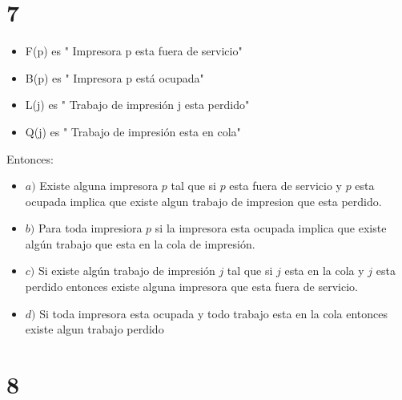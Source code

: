 \documentclass[12pt, fleqn]{article}                            %
\theoremstyle{break}                                            %
\begin{document}
\clearpage
\section{7}

    \begin{itemize}
        \item F(p) es " Impresora p esta fuera de servicio"
        \item B(p) es " Impresora p está ocupada"
        \item L(j) es " Trabajo de impresión j esta perdido"
        \item Q(j) es " Trabajo de impresión esta en cola"
    \end{itemize}

    Entonces:
    \begin{itemize}
        
        \item $a)$
            Existe alguna impresora $p$ tal que si $p$ esta fuera de servicio
            y $p$ esta ocupada implica que existe algun trabajo de impresion
            que esta perdido.

        \item $b)$
            Para toda impresiora $p$ si la impresora esta ocupada implica
            que existe algún trabajo que esta en la cola de impresión.

        \item $c)$
            Si existe algún trabajo de impresión $j$ tal que si $j$ esta
            en la cola y $j$ esta perdido entonces existe alguna impresora
            que esta fuera de servicio.

        \item $d)$
            Si toda impresora esta ocupada y todo trabajo esta en la cola
            entonces existe algun trabajo perdido

    \end{itemize}




\clearpage
\section{8}
\end{document}
